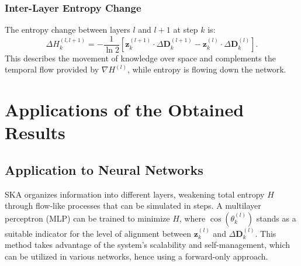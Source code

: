 \documentclass{article}
\begin{document}
\subsubsection*{Inter-Layer Entropy Change}
The entropy change between layers \( l \) and \( l+1 \) at step \( k \) is:
\begin{equation}
	\Delta H^{(l,l+1)}_k = -\frac{1}{\ln 2} \left[ \mathbf{z}^{(l+1)}_k \cdot \Delta \mathbf{D}^{(l+1)}_k - \mathbf{z}^{(l)}_k \cdot \Delta \mathbf{D}^{(l)}_k \right].
\end{equation}
This describes the movement of knowledge over space and complements the temporal flow provided by \( \nabla H^{(l)} \), while entropy is flowing down the network.
\section{Applications of the Obtained Results}
\subsection{Application to Neural Networks}

SKA organizes information into different layers, weakening total entropy \( H \) through flow-like processes that can be simulated in steps. A multilayer perceptron (MLP) can be trained to minimize \( H \), where \( \cos (\theta^{(l)}_k) \) stands as a suitable indicator for the level of alignment between \( \mathbf{z}^{(l)}_k \) and \(\Delta \mathbf{D}^{(l)}_k \). This method takes advantage of the system's scalability and self-management, which can be utilized in various networks, hence using a forward-only approach.
\end{document}
